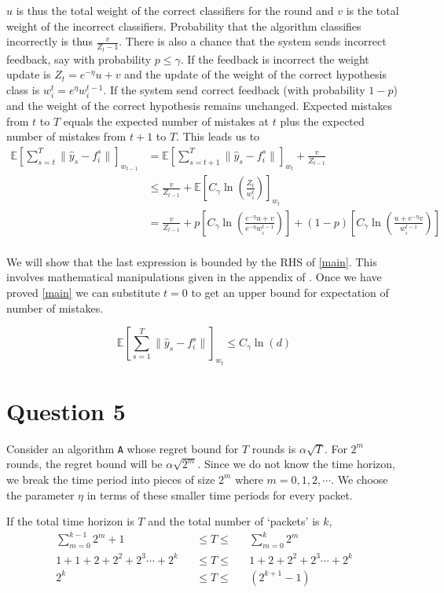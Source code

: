 \documentclass{article}
\begin{document}
$u$ is thus the total weight of the correct classifiers for the round and $v$ is the total weight of the incorrect classifiers. Probability that the algorithm classifies incorrectly is thus $\frac{v}{Z_t-1}$. There is also a chance that the system sends incorrect feedback, say with probability $p \leq \gamma$. If the feedback is incorrect the weight update is $Z_t = e^{-\eta}u+v$ and the update of the weight of the correct hypothesis class is $ w_i^t = e^{\eta} w_i^{t-1} $. If the system send correct feedback (with probability \(1-p\)) and the weight of the correct hypothesis remains unchanged. Expected mistakes from $t$ to $T$ equals the expected number of mistakes at $t$ plus the expected number of mistakes from $t+1$ to $T$. This leads us to
\begin{align*}
	\mathbb{E}\left[\sum_{s=t}^{T}\|\hat{y}_s-f_i^s\|\right]_{w_{t-1}} &= \mathbb{E}\left[\sum_{s=t+1}^{T}\|\hat{y}_s-f_i^s\|\right]_{w_t} + \frac{v}{Z_{t-1}} \\
&\leq \frac{v}{Z_{t-1}} + \mathbb{E}\left[C_{\gamma}\ln{\left(\frac{Z_t}{w_i^t}\right)}\right]_{w_t}\\
&= \frac{v}{Z_{t-1}} + p\left[C_{\gamma}\ln{\left(\frac{e^{-\eta}u + v}{e^{-\eta}w_i^{t-1}}\right)}\right] +  (1-p)\left[C_{\gamma}\ln{\left(\frac{u + e^{-\eta}v}{w_i^{t-1}}\right)}\right]\\
\end{align*}

We will show that the last expression is bounded by the RHS of \eqref{main}. This involves mathematical manipulations given in the appendix of \cite{ben2009agnostic}. Once we have proved \eqref{main} we can substitute $t=0$ to get an upper bound for expectation of number of mistakes.

\[
\boxed{\mathbb{E}\left[\sum_{s=1}^{T}\|\hat{y}_s-f_i^s\|\right]_{w_t} \leq C_{\gamma} \ln(d)}
\]
\newpage
\section*{Question 5}
Consider an algorithm \texttt{A} whose regret bound for $T$ rounds is $\alpha \sqrt{T}$. For $2^m$ rounds, the regret bound will be $\alpha \sqrt{2^m}$. Since we do not know the time horizon, we break the time period into pieces of size $2^m$ where $m = 0, 1, 2, \cdots$. We choose the parameter $\eta$ in terms of these smaller time periods for every packet.

If the total time horizon is $T$ and the total number of `packets' is $k$,
\begin{align*}
    \sum_{m=0}^{k-1} 2^m +1              &&\leq T \leq &&\sum_{m=0}^{k} 2^m \\
    1 + 1 + 2 + 2^2 + 2^3 \cdots + 2^k   &&\leq T \leq &&1 + 2 + 2^2 + 2^3 \cdots + 2^k\\
    2^k                                  &&\leq T \leq &&(2^{k+1}-1)
\end{align*}
\end{document}
